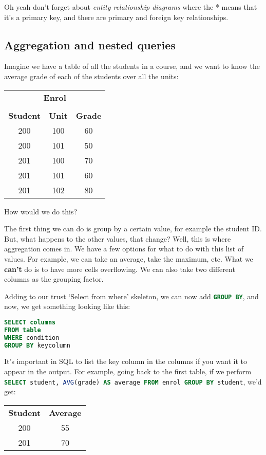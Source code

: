 \documentclass[11pt,a4paper,titlepage,dvipsnames,cmyk]{scrartcl}
\begin{document}
Oh yeah don't forget about \textit{entity relationship diagrams} where the
* means that it's a primary key, and there are primary and foreign key
relationships.

\subsection{Aggregation and nested queries}%
\label{sub:aggregation}

Imagine we have a table of all the students in a course, and we want to
know the average grade of each of the students over all the units:

\begin{center}
    \begin{tabular}{|c|c|c|}
        \multicolumn{3}{c}{\textbf{Enrol}} \\
        \multicolumn{3}{c}{} \\
        \hline
        \textbf{Student} & \textbf{Unit} & \textbf{Grade} \\
        \hhline{|=|=|=|}
        200 & 100 & 60 \\ \hline
        200 & 101 & 50 \\ \hline
        201 & 100 & 70 \\ \hline
        201 & 101 & 60 \\ \hline
        201 & 102 & 80 \\ \hline
    \end{tabular}
\end{center}

How would we do this?

The first thing we can do is group by a certain value, for example the
student ID. But, what happens to the other values, that change? Well, this
is where aggregation comes in. We have a few options for what to do with
this list of values. For example, we can take an average, take the
maximum, etc. What we \textbf{can't} do is to have more cells overflowing.
We can also take two different columns as the grouping factor.

Adding to our trust `Select from where' skeleton, we can now add
\lstinline[language=SQL]|GROUP BY|, and now, we get something looking like this:

\begin{lstlisting}[language=SQL]
SELECT columns
FROM table
WHERE condition
GROUP BY keycolumn
\end{lstlisting}

It's important in SQL to list the key column in the columns if you want it
to appear in the output. For example, going back to the first table, if we
perform \lstinline[language=SQL]|SELECT student, AVG(grade) AS average FROM enrol GROUP BY student|, we'd get:

\begin{center}
    \begin{tabular}{|c|c|}
        \hline
        \textbf{Student} & \textbf{Average} \\ \hhline{|=|=|}
        200 & 55 \\ \hline
        201 & 70 \\ \hline
    \end{tabular}
\end{center}
\end{document}
